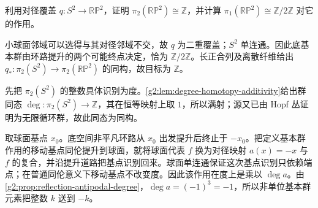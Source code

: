 \begin{exercise}\label{g2:ex:rp2-higher-action}
	利用对径覆盖 \(q:S^2\rightarrow\mathbb{RP}^2\)，证明 \(\pi_2(\mathbb{RP}^2)\cong\mathbb Z\)，并计算 \(\pi_1(\mathbb{RP}^2)\cong\mathbb Z/2\mathbb Z\) 对它的作用。
\end{exercise}
\begin{solution}
	小球面邻域可以选得与其对径邻域不交，故 \(q\) 为二重覆盖；\(S^2\) 单连通。因此底基本群由环路提升的两个可能终点决定，恰为 \(\mathbb Z/2\mathbb Z\)。长正合列及离散纤维给出 \(q_*:\pi_2(S^2)\rightarrow\pi_2(\mathbb{RP}^2)\) 的同构，故目标为 \(\mathbb Z\)。

	先把 \(\pi_2(S^2)\) 的整数具体识别为度。\cref{g2:lem:degree-homotopy-additivity}给出群同态 \(\deg:\pi_2(S^2)\rightarrow\mathbb Z\)，其在恒等映射上取 \(1\)，所以满射；源又已由 Hopf 丛证明为无限循环群，故此同态为同构。

	取球面基点 \(x_0\)。底空间非平凡环路从 \(x_0\) 出发提升后终止于 \(-x_0\)。把定义基本群作用的移动基点同伦提升到球面，就将球面代表 \(f\) 换为对径映射 \(a(x)=-x\) 与 \(f\) 的复合，并沿提升道路把基点识别回来。球面单连通保证这次基点识别只依赖端点；在普通同伦意义下移动基点不改变度。因此该作用在度上是乘以 \(\deg a\)。由\cref{g2:prop:reflection-antipodal-degree}，\(\deg a=(-1)^3=-1\)，所以非单位基本群元素把整数 \(k\) 送到 \(-k\)。
\end{solution}

